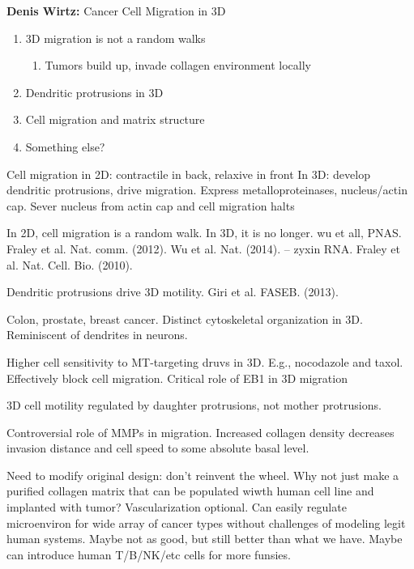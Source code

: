 \documentclass[11pt,letterpaper,final] {article}
\begin{document}

{\bfseries Denis Wirtz:} Cancer Cell Migration in 3D

\begin{enumerate}
	\item 3D migration is not a random walks
		\begin{enumerate}
			\item Tumors build up, invade collagen environment locally
		\end{enumerate}
	\item Dendritic protrusions in 3D
	\item Cell migration and matrix structure
	\item Something else?
\end{enumerate}

Cell migration in 2D: contractile in back, relaxive in front
In 3D: develop dendritic protrusions, drive migration. Express metalloproteinases, nucleus/actin cap. Sever nucleus from actin cap and cell migration halts

In 2D, cell migration is a random walk. In 3D, it is no longer. wu et all, PNAS. Fraley et al. Nat. comm. (2012). Wu et al. Nat. (2014). -- zyxin RNA. Fraley et al. Nat. Cell. Bio. (2010). 

Dendritic protrusions drive 3D motility. Giri et al. FASEB. (2013). 

Colon, prostate, breast cancer. Distinct cytoskeletal organization in 3D. Reminiscent of dendrites in neurons.

Higher cell sensitivity to MT-targeting druvs in 3D. E.g., nocodazole and taxol. Effectively block cell migration. Critical role of EB1 in 3D migration

3D cell motility regulated by daughter protrusions, not mother protrusions.

Controversial role of MMPs in migration. Increased collagen density decreases invasion distance and cell speed to some absolute basal level. 

Need to modify original design: don't reinvent the wheel. Why not just make a purified collagen matrix that can be populated wiwth human cell line and implanted with tumor? Vascularization optional. Can easily regulate microenviron for wide array of cancer types without challenges of modeling legit human systems. Maybe not as good, but still better than what we have. Maybe can introduce human T/B/NK/etc cells for more funsies. 
\end{document}
